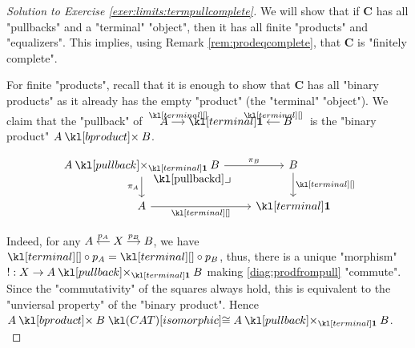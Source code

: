\documentclass[main.tex]{subfiles}
\begin{document}
\begin{proof}[Solution to Exercise \ref{exer:limits:termpullcomplete}]\label{soln:limits:termpullcomplete}
    We will show that if $\mathbf{C}$ has all "pullbacks" and a "terminal" "object", then it has all finite "products" and "equalizers". This implies, using Remark \ref{rem:prodeqcomplete}, that $\mathbf{C}$ is "finitely complete".

    For finite "products", recall that it is enough to show that $\mathbf{C}$ has all "binary products" as it already has the empty "product" (the "terminal" "object"). We claim that the "pullback" of $\begin{tikzcd}[cramped, sep=small] A \arrow[r, "\termmorph"] & \terminal & B \arrow[l, "\termmorph"'] \end{tikzcd}$ is the "binary product" $A \product B$.%
    \begin{marginfigure}
        \begin{equation}
            \begin{tikzcd}
                {A\pullback{\terminal} B} & B \\
                A & \terminal
                \arrow["{\pi_A}"', from=1-1, to=2-1]
                \arrow["{\pi_B}", from=1-1, to=1-2]
                \arrow["\termmorph", from=1-2, to=2-2]
                \arrow["\termmorph"', from=2-1, to=2-2]
                \arrow["\pullbackd"{anchor=center, pos=0.125}, draw=none, from=1-1, to=2-2]
            \end{tikzcd}
        \end{equation}
    \end{marginfigure}
    Indeed, for any $\begin{tikzcd}[cramped, sep=small] A &\arrow[l, "p_A"']  X\arrow[r, "p_B"]&B \end{tikzcd}$, we have $\termmorph \circ p_A = \termmorph \circ p_B$, thus, there is a unique "morphism" $!:X \rightarrow A\pullback{\terminal} B$ making \eqref{diag:prodfrompull} "commute". Since the "commutativity" of the squares always hold, this is equivalent to the "unviersal property" of the "binary product". Hence $A \product B \isoCAT A \pullback{\terminal} B$.
    \begin{equation}\label{diag:prodfrompull}

\end{equation}
\end{proof}
\end{document}
